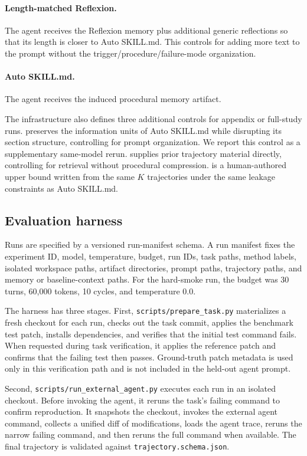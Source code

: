 \paragraph{Length-matched Reflexion.} The agent receives the Reflexion memory plus additional generic reflections so that its length is closer to Auto SKILL.md. This controls for adding more text to the prompt without the trigger/procedure/failure-mode organization.

\paragraph{Auto SKILL.md.} The agent receives the induced procedural memory artifact.

The infrastructure also defines three additional controls for appendix or full-study runs.  preserves the information units of Auto SKILL.md while disrupting its section structure, controlling for prompt organization. We report this control as a supplementary same-model rerun.  supplies prior trajectory material directly, controlling for retrieval without procedural compression.  is a human-authored upper bound written from the same $K$ trajectories under the same leakage constraints as Auto SKILL.md.

\subsection{Evaluation harness}
\label{sec:method_harness}

Runs are specified by a versioned run-manifest schema. A run manifest fixes the experiment ID, model, temperature, budget, run IDs, task paths, method labels, isolated workspace paths, artifact directories, prompt paths, trajectory paths, and memory or baseline-context paths. For the hard-smoke run, the budget was 30 turns, 60,000 tokens, 10 cycles, and temperature 0.0.

The harness has three stages. First, \texttt{scripts/prepare\_task.py} materializes a fresh checkout for each run, checks out the task commit, applies the benchmark test patch, installs dependencies, and verifies that the initial test command fails. When requested during task verification, it applies the reference patch and confirms that the failing test then passes. Ground-truth patch metadata is used only in this verification path and is not included in the held-out agent prompt.

Second, \texttt{scripts/run\_external\_agent.py} executes each run in an isolated checkout. Before invoking the agent, it reruns the task's failing command to confirm reproduction. It snapshots the checkout, invokes the external agent command, collects a unified diff of modifications, loads the agent trace, reruns the narrow failing command, and then reruns the full command when available. The final trajectory is validated against \texttt{trajectory.schema.json}.

